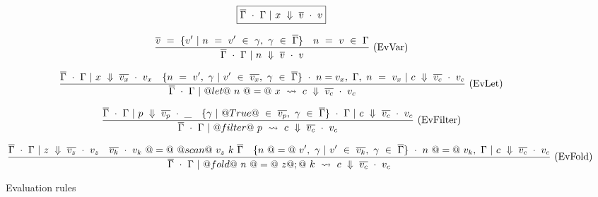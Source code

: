 
\begin{figure*}

$$
\boxed{\overline{\Gamma} ~\cdot~ \Gamma ~|~ x ~\Downarrow~ \overline{v} ~\cdot~ v}
$$


$$
\frac {\displaystyle 
    \overline{v} ~=~ \{ v' ~|~ n ~=~ v' ~\in~ \gamma,~ \gamma ~\in~ \overline{\Gamma} \}
    \quad
    n ~=~ v ~\in~ \Gamma
} {\displaystyle  
    \overline{\Gamma} ~\cdot~ \Gamma ~|~ n ~\Downarrow~ \overline{v} ~\cdot~ v
} \ 
\textrm{(EvVar)}
$$

$$
\frac {\displaystyle 
    \overline{\Gamma} ~\cdot~ \Gamma ~|~ x ~\Downarrow~ \overline{v_x} ~\cdot~ v_x
    \quad
    \{ n~=~v',~\gamma ~|~ v' ~\in~ \overline{v_x},~\gamma ~\in~ \overline{\Gamma}\} ~\cdot~ n=v_x,~\Gamma,~n~=~v_x ~|~ c ~\Downarrow~ \overline{v_c} ~\cdot~ v_c
} {\displaystyle 
    \overline{\Gamma} ~\cdot~ \Gamma ~|~ @let@~n~@=@~x~\leadsto~c ~\Downarrow~ \overline{v_c} ~\cdot~ v_c
} \ 
\textrm{(EvLet)}
$$

$$
\frac {\displaystyle 
    \overline{\Gamma} ~\cdot~ \Gamma ~|~ p ~\Downarrow~ \overline{v_p} ~\cdot~ \_
    \quad
    \{\gamma ~|~ @True@ ~\in~ \overline{v_p},~ \gamma ~\in~ \overline{\Gamma} \} ~\cdot~ \Gamma ~|~ c ~\Downarrow~ \overline{v_c} ~\cdot~ v_c
} {\displaystyle 
    \overline{\Gamma} ~\cdot~ \Gamma ~|~ @filter@~p~\leadsto~c ~\Downarrow~ \overline{v_c} ~\cdot~ v_c
} \ 
\textrm{(EvFilter)}
$$

$$
\frac {\displaystyle 
    \overline{\Gamma} ~\cdot~ \Gamma ~|~ z ~\Downarrow~ \overline{v_z} ~\cdot~ v_z
    \quad
    \overline{v_k}~\cdot~v_k~@=@~@scan@~v_z~k~\overline{\Gamma}
    \quad
    \{n~@=@~v',~\gamma ~|~ v' ~\in~ \overline{v_k},~ \gamma ~\in~ \overline{\Gamma} \} ~\cdot~ n~@=@~v_k,~\Gamma ~|~ c ~\Downarrow~ \overline{v_c} ~\cdot~ v_c
} {\displaystyle 
    \overline{\Gamma} ~\cdot~ \Gamma ~|~ @fold@~n~@=@~z@;@~k~\leadsto~c ~\Downarrow~ \overline{v_c} ~\cdot~ v_c
} \ 
\textrm{(EvFold)}
$$

\caption{Evaluation rules}
\label{fig:source:eval}
\end{figure*}


